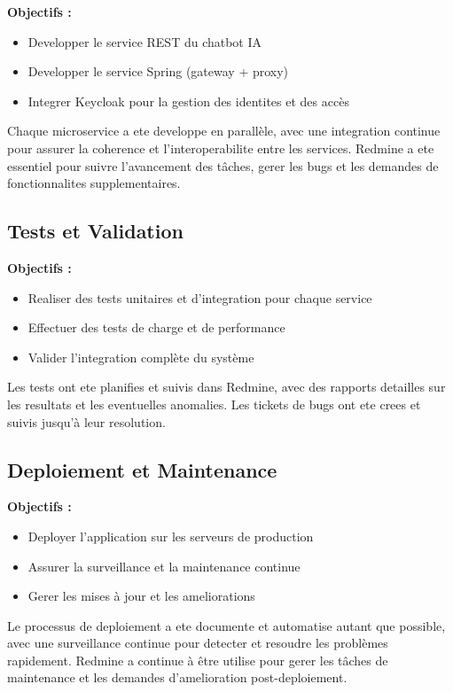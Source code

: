 \documentclass[a4paper, 11pt, openany]{report}
\begin{document}
\textbf{Objectifs :}
\begin{itemize}
    \item Developper le service REST du chatbot IA
    \item Developper le service Spring (gateway + proxy)
    \item Integrer Keycloak pour la gestion des identites et des accès
\end{itemize}

Chaque microservice a ete developpe en parallèle, avec une integration continue pour assurer la coherence et l'interoperabilite entre les services. Redmine a ete essentiel pour suivre l'avancement des tâches, gerer les bugs et les demandes de fonctionnalites supplementaires.

\subsection{Tests et Validation}

\textbf{Objectifs :}
\begin{itemize}
    \item Realiser des tests unitaires et d'integration pour chaque service
    \item Effectuer des tests de charge et de performance
    \item Valider l'integration complète du système
\end{itemize}

Les tests ont ete planifies et suivis dans Redmine, avec des rapports detailles sur les resultats et les eventuelles anomalies. Les tickets de bugs ont ete crees et suivis jusqu'à leur resolution.

\subsection{Deploiement et Maintenance}

\textbf{Objectifs :}
\begin{itemize}
    \item Deployer l'application sur les serveurs de production
    \item Assurer la surveillance et la maintenance continue
    \item Gerer les mises à jour et les ameliorations
\end{itemize}

Le processus de deploiement a ete documente et automatise autant que possible, avec une surveillance continue pour detecter et resoudre les problèmes rapidement. Redmine a continue à être utilise pour gerer les tâches de maintenance et les demandes d'amelioration post-deploiement.
\end{document}
